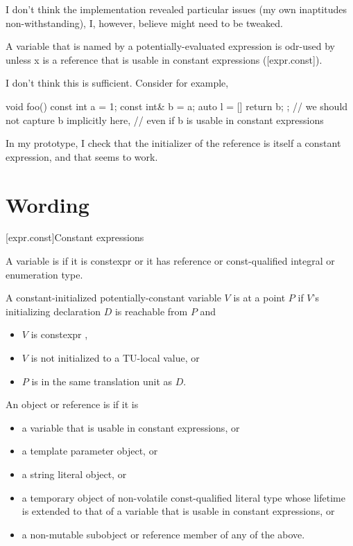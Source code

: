 \documentclass{wg21}
\begin{document}
I don't think the implementation revealed particular issues (my own inaptitudes non-withstanding), I, however, believe 
might need to be tweaked.

\begin{quoteblock}
A variable  that is named by a potentially-evaluated expression  is odr-used by  unless x is a reference that is usable in constant expressions ([expr.const]).
\end{quoteblock}

I don't think this is sufficient. Consider for example,

\begin{colorblock}
void foo() {
    const int a = 1;
    const int& b = a;
    auto l = [] { return b; }; // we should not capture b implicitly here,
                               // even if b is usable in constant expressions
}
\end{colorblock}

In my prototype, I check that the initializer of the reference is itself a constant expression, and that seems to work.

\section{Wording}

[expr.const]{Constant expressions}%

\pnum
A variable is  if
it is constexpr or
it has reference or const-qualified integral or enumeration type.

\pnum
A constant-initialized potentially-constant variable $V$ is
 at a point $P$ if
$V$'s initializing declaration $D$ is reachable from $P$ and
\begin{itemize}
    \item $V$ is constexpr ,
    \item $V$ is not initialized to a TU-local value, or
    \item $P$ is in the same translation unit as $D$.
\end{itemize}
An object or reference is  if it is
\begin{itemize}
    \item a variable that is usable in constant expressions, or
    \item a template parameter object, or
    \item a string literal object, or
    \item a temporary object of non-volatile const-qualified literal type
    whose lifetime is extended
    to that of a variable that is usable in constant expressions, or
    \item a non-mutable subobject or reference member of any of the above.
\end{itemize}
\end{document}
